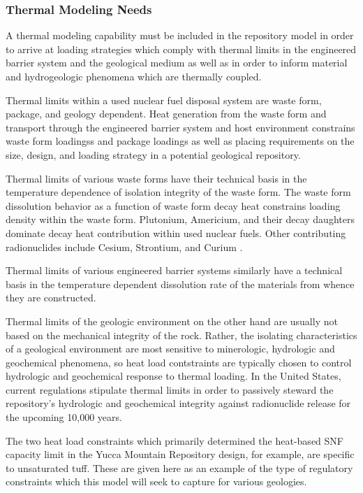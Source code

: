 \subsubsection{Thermal Modeling Needs}
A thermal modeling capability must be included in the repository 
model in order to arrive at loading strategies which comply with 
thermal limits in the engineered barrier system and the geological 
medium as well as in order to inform material and hydrogeologic 
phenomena which are thermally coupled. 

Thermal limits within a used nuclear fuel disposal system are waste 
form, package, and geology dependent. Heat generation from the waste form 
and transport through the engineered barrier system and host 
environment constrains waste form loadingss and package loadings as 
well as placing requirements on the size, design, and loading strategy 
in a potential geological repository.

Thermal limits of various waste forms have their technical basis in 
the temperature dependence of isolation integrity of the waste form.  
The waste form dissolution behavior as a function of waste form decay heat 
constrains loading density within the waste form. Plutonium, Americium, and 
their decay daughters dominate decay heat contribution within used nuclear 
fuels. Other contributing radionuclides include Cesium, Strontium, and Curium 
\cite{piet_which_2007}. 
 
Thermal limits of various engineered barrier systems similarly have 
a technical basis in the temperature dependent dissolution rate of the 
materials from whence they are constructed.  

Thermal limits of the geologic environment on the other hand are 
usually not based on the mechanical integrity of the rock.  Rather, 
the isolating characteristics of a geological environment are most 
sensitive to minerologic, hydrologic and geochemical phenomena, so heat load 
contstraints are typically chosen to control hydrologic and 
geochemical response to thermal loading. In the United States, current 
regulations stipulate thermal limits in order to passively steward the 
repository's hydrologic and geochemical integrity against radionuclide  
release for the upcoming 10,000 years.

The two heat load constraints which primarily determined the 
heat-based SNF capacity limit in the Yucca Mountain Repository design, 
for example, are specific to unsaturated tuff. These are given here as an 
example of the type of regulatory constraints which this model will seek to 
capture for various geologies. 

